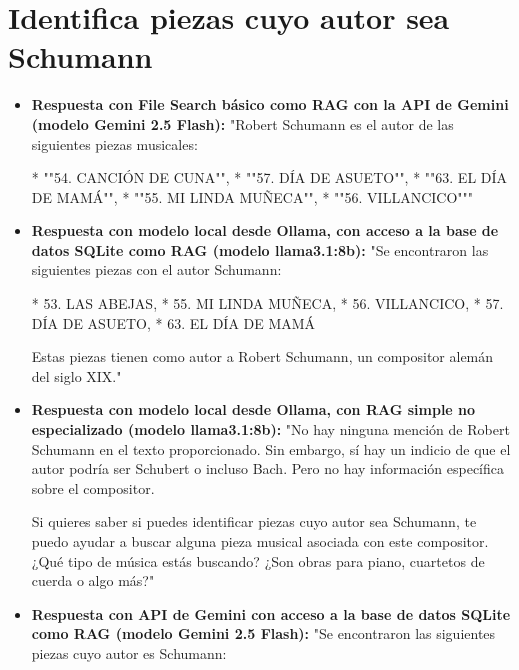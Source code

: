 \section{Identifica piezas cuyo autor sea Schumann}
\begin{itemize}
    \item \textbf{Respuesta con File Search básico como RAG con la API de Gemini (modelo Gemini 2.5 Flash):} "Robert Schumann es el autor de las siguientes piezas musicales: 

*   ""54. CANCIÓN DE CUNA"",
*   ""57. DÍA DE ASUETO"",
*   ""63. EL DÍA DE MAMÁ"",
*   ""55. MI LINDA MUÑECA"",
*   ""56. VILLANCICO"""
    \item \textbf{Respuesta con modelo local desde Ollama, con acceso a la base de datos SQLite como RAG (modelo llama3.1:8b):} "Se encontraron las siguientes piezas con el autor Schumann:

* 53. LAS ABEJAS,
* 55. MI LINDA MUÑECA,
* 56. VILLANCICO,
* 57. DÍA DE ASUETO,
* 63. EL DÍA DE MAMÁ

Estas piezas tienen como autor a Robert Schumann, un compositor alemán del siglo XIX."
    \item \textbf{Respuesta con modelo local desde Ollama, con RAG simple no especializado (modelo llama3.1:8b):} "No hay ninguna mención de Robert Schumann en el texto proporcionado. Sin embargo, sí hay un indicio de que el autor podría ser Schubert o incluso Bach. Pero no hay información específica sobre el compositor.

Si quieres saber si puedes identificar piezas cuyo autor sea Schumann, te puedo ayudar a buscar alguna pieza musical asociada con este compositor. ¿Qué tipo de música estás buscando? ¿Son obras para piano, cuartetos de cuerda o algo más?"
    \item \textbf{Respuesta con API de Gemini con acceso a la base de datos SQLite como RAG (modelo Gemini 2.5 Flash):} "Se encontraron las siguientes piezas cuyo autor es Schumann:


\end{itemize}
